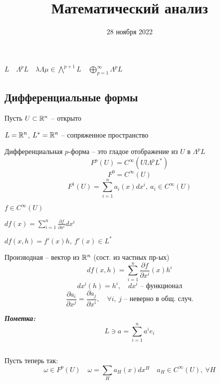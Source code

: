 


    \title{Математический анализ}
    \date{28 ноября 2022}
    \maketitle{}

    \pagebreak

    $L \quad \Lambda^pL \quad \lambda\Lambda\mu \in \bigwedge^{p+1}L \quad \bigoplus_{p=1}^\infty \Lambda^pL$

    \subsection*{Дифференциальные формы}

    \par Пусть $U \subset \mathbb{R}^n$ -- открыто
    \par $L = \mathbb{R}^n$, $L^* = \mathbb{R}^n$ -- сопряженное пространство

    \begin{definition}
        Дифференциальная $p$-форма -- это гладое отображение из $U$ в $\Lambda^pL$
        \[
            F^p(U) = C^\infty(Ul \Lambda^pL^*)    
        \]
        \[
            F^0 = C^\infty(U)    
        \]
        \[
            F^1(U) = \sum_{i=1}^n a_i(x)dx^i, \ a_i \in C^\infty(U)    
        \]
    \end{definition}

    \begin{illustration*}
        $f \in C^\infty(U)$
        \par $df(x) = \sum_{i=1}^n \frac{\partial f}{\partial x^i} dx^i$
        \par $df(x, h) = f'(x) h, \ f'(x) \in L^* $
        \par Производная -- вектор из $\mathbb{R}^n$ (сост. из частных пр-ых)
        \[
            df(x, h) = \sum_{i=1}^n \frac{\partial f}{\partial x^i}(x) h^i    
        \]
        \[
            dx^i(h) = h^i, \quad  dx^i \text{ -- функционал}    
        \]
        \[
            \frac{\partial a_i}{\partial x^j} = \frac{\partial a_j}{\partial x^i}, \quad \forall i, \ j \text{ -- неверно в общ. случ.}
        \]
        \par \quad \textbf{\textit{Пометка:}}\[
            L \ni a = \sum_{i=1}^n a^i e_i
        \]
    \end{illustration*}

    \par $ $
    \par Пусть теперь так:
    \[
        \omega \in F^p(U) \quad \omega = \sum_H a_H(x) dx^H \quad a_H \in C^\infty(U), \ \forall H   
    \]
    
